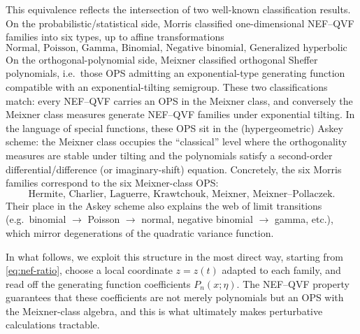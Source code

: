 \documentclass[a4paper,11pt]{article}
\numberwithin{equation}{section}
\theoremstyle{plain}
\theoremstyle{definition}
\theoremstyle{remark}
\newcommand{\1}{\ensuremath{\mathds{1}}\xspace}
\begin{document}
This equivalence reflects the intersection of two well-known classification results.
On the probabilistic/statistical side, Morris classified one-dimensional NEF--QVF families into six types, up to affine
transformations
\[
\text{Normal, Poisson, Gamma, Binomial, Negative binomial, Generalized hyperbolic secant.}
\]
On the orthogonal-polynomial side, Meixner classified orthogonal Sheffer polynomials, i.e.\
those OPS admitting an exponential-type generating function compatible with an exponential-tilting semigroup.
These two classifications match: every NEF--QVF carries an OPS in the Meixner class, and conversely the Meixner
class measures generate NEF--QVF families under exponential tilting. In the language of special functions, these OPS sit
in the (hypergeometric) Askey scheme: the Meixner class occupies the ``classical'' level where the orthogonality
measures are stable under tilting and the polynomials satisfy a second-order differential/difference (or imaginary-shift)
equation. Concretely, the six Morris families correspond to the six Meixner-class OPS:
\[
\text{Hermite, Charlier, Laguerre, Krawtchouk, Meixner, Meixner--Pollaczek}.
\]
Their place in the Askey scheme also explains the web of limit transitions (e.g.\ binomial $\to$ Poisson $\to$ normal,
negative binomial $\to$ gamma, etc.), which mirror degenerations of the quadratic variance function.

In what follows, we exploit this structure in the most direct way, starting from \eqref{eq:nef-ratio}, choose a local
coordinate $z=z(t)$ adapted to each family, and read off the generating function coefficients $P_n(x;\eta)$. The NEF--QVF
property guarantees that these coefficients are not merely polynomials but an OPS with the Meixner-class algebra, and this
is what ultimately makes perturbative calculations tractable.
\end{document}
